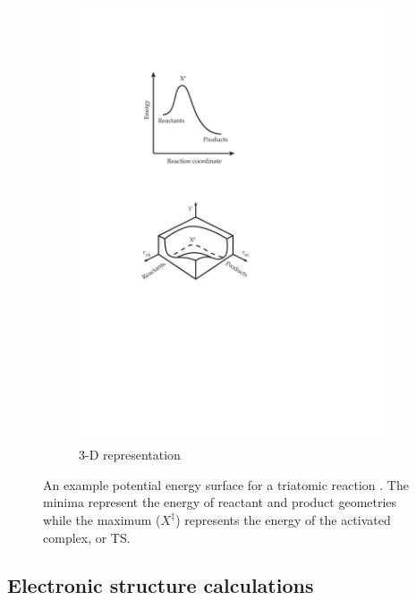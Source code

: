 \documentclass[preprint, 11pt]{elsarticle} %
\begin{document}
\begin{figure}[htbp]
\begin{subfigure}[t]{.5\textwidth}
  \includegraphics{TST-3D-PES}
  \caption{3-D representation}
  \label{fig:sub2}
\end{subfigure}
\caption{An example potential energy surface for a triatomic reaction  . The minima represent the energy of reactant and product geometries while the maximum ($X^\ddagger$) represents the energy of the activated complex, or TS. }
\label{fig:pes}
\end{figure}

\subsection{Electronic structure calculations}
\end{document}
